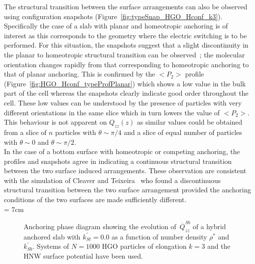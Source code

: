 The structural transition between the surface arrangements can also be observed using
configuration snapshots (\eg Figure~\ref{fig:typeSnap_HGO_Hconf_k3}). Specifically the case of a
slab with planar and homeotropic anchoring is of interest as this corresponds to the geometry
where the electric switching is to be performed. For this situation, the snapshots suggest that a
slight discontinuity in the planar to homeotropic structural transition can be observed~; the
molecular orientation changes rapidly from that corresponding to homeotropic anchoring to that
of planar anchoring. This is confirmed by the $<P_2>$ profile
(Figure~\ref{fig:HGO_Hconf_typeProfPlanar}) which shows a low value in the bulk part of the cell
whereas the snapshots clearly indicate good order throughout the cell. These low values can be
understood by the presence of particles with very different orientations in the same slice which
in turn lowers the value of $<P_2>$. This behaviour is not apparent on $Q_{zz}(z)$ as similar
values could be obtained from a slice of $n$ particles with $\theta\sim\pi/4$ and a slice of
equal number of particles with $\theta\sim 0$ and $\theta\sim\pi/2$.\\
In the case of a bottom surface with homeotropic or competing anchoring, the profiles and
snapshots agree in indicating a continuous structural transition between the two surface induced
arrangements. These observation are consistent with the simulation of Cleaver and
Teixeira~\cite{Cleaver_Teixeira_01} who found a discontinuous structural transition between the
two surface arrangement provided the anchoring conditions of the two surfaces are made
sufficiently different.\\

\picW = 7cm
\begin{figure}
	\centering
	\caption{Anchoring phase diagram  showing the evolution of~$\overline{Q}^{Sb}_{zz}$
	of a hybrid anchored slab with $k^\prime_{St}=0.0$ as a function
	of number density  $\rho^{*}$ and $k^\prime_{Sb}$. Systems of $N=1000$ HGO particles
	of elongation $k=3$
	and the HNW surface potential have been used. }
	\label{fig:anchPhaseDia_HGO_Hconf_k3}
\end{figure}


